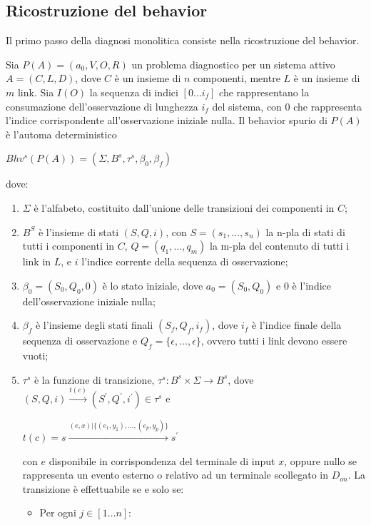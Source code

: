 \subsection{Ricostruzione del behavior}
Il primo passo della diagnosi monolitica consiste nella ricostruzione del behavior. 
\begin{defn}
Sia $P(A) = (a_0,V,O,R)$ un problema diagnostico per un sistema attivo $A = (C,L,D)$, dove $C$ è un insieme di $n$ componenti, mentre $L$ è un insieme di $m$ link. Sia $I(O)$ la sequenza di indici $[0 \ldots i_f]$ che rappresentano la consumazione dell'osservazione di lunghezza $i_f$ del sistema, con $0$ che rappresenta l'indice corrispondente all'osservazione iniziale nulla. Il behavior spurio di $P(A)$ è l'automa deterministico
\begin{center}
	$Bhv^s(P(A)) = (\Sigma,B^s,\tau^s,\beta_0,\beta_f)$
\end{center}
dove:
\begin{enumerate}
\item $\Sigma$ è l'alfabeto, costituito dall'unione delle transizioni dei componenti in $C$;
\item $B^S$ è l'insieme di stati $(S,Q,i)$, con $S = (s_1,\ldots,s_n)$ la n-pla di stati di tutti i componenti in $C$, $Q = (q_1,\ldots,q_m)$ la m-pla del contenuto di tutti i link in $L$, e $i$ l'indice corrente della sequenza di osservazione;
\item $\beta_0 = (S_0,Q_0,0)$ è lo stato iniziale, dove $a_0 = (S_0,Q_0)$ e $0$ è l'indice dell'osservazione iniziale nulla;
\item $\beta_f$ è l'insieme degli stati finali $(S_f,Q_f,i_f)$, dove $i_f$ è l'indice finale della sequenza di osservazione e $Q_f = \{\epsilon, \ldots, \epsilon\}$, ovvero tutti i link devono essere vuoti;
\item $\tau^s$ è la funzione di transizione, $\tau^s: B^s \times \Sigma \rightarrow B^s$, dove $(S,Q,i) \xrightarrow{t(c)} (S^\prime,Q^\prime,i^\prime) \in \tau^s$ e 
\begin{center}
	$t(c) = s \xrightarrow{(e,x) | \{(e_1,y_1), \ldots, (e_p,y_p)\}} s^\prime$
\end{center}
con $e$ disponibile in corrispondenza del terminale di input $x$, oppure nullo se rappresenta un evento esterno o relativo ad un terminale scollegato in $D_\mathit{on}$. La transizione è effettuabile se e solo se:
\begin{itemize}
\item Per ogni $j \in [1 \ldots n]$:
\begin{center}

\end{center}
\end{itemize}
\end{enumerate}
\end{defn}
